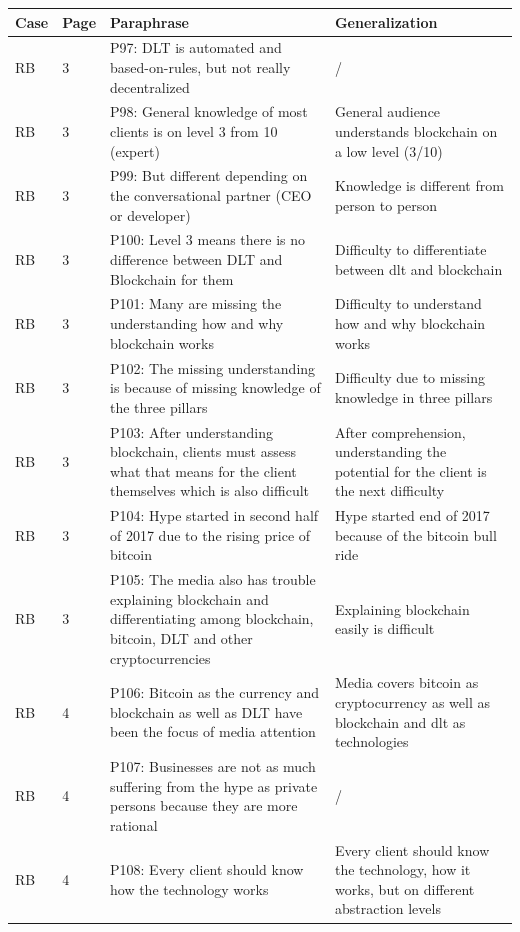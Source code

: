 \begin{table}[H]
    \centering
    \begin{tabularx}{\textwidth}{ll|X|p{4.5cm}}
	Case & Page & Paraphrase & Generalization \\ \hline
	RB & 3 & P97: DLT is automated and based-on-rules, but not really decentralized & /   \\  
	RB & 3 & P98: General knowledge of most clients is on level 3 from 10 (expert) & General audience understands blockchain on a low level (3/10)   \\  
	RB & 3 & P99: But different depending on the conversational partner (CEO or developer) & Knowledge is different from person to person   \\  
	RB & 3 & P100: Level 3 means there is no difference between DLT and Blockchain for them & Difficulty to differentiate between dlt and blockchain   \\  
	RB & 3 & P101: Many are missing the understanding how and why blockchain works & Difficulty to understand how and why blockchain works   \\  
	RB & 3 & P102: The missing understanding is because of missing knowledge of the three pillars & Difficulty due to missing knowledge in three pillars   \\  
	RB & 3 & P103: After understanding blockchain, clients must assess what that means for the client themselves which is also difficult & After comprehension, understanding the potential for the client is the next difficulty   \\  
	RB & 3 & P104: Hype started in second half of 2017 due to the rising price of bitcoin & Hype started end of 2017 because of the bitcoin bull ride   \\  
	RB & 3 & P105: The media also has trouble explaining blockchain and differentiating among blockchain, bitcoin, DLT and other cryptocurrencies & Explaining blockchain easily is difficult   \\  
	RB & 4 & P106: Bitcoin as the currency and blockchain as well as  DLT have been the focus of media attention & Media covers bitcoin as cryptocurrency as well as blockchain and dlt as technologies   \\  
	RB & 4 & P107: Businesses are not as much suffering from the hype as private persons because they are more rational & /   \\  
	RB & 4 & P108: Every client should know how the technology works & Every client should know the technology, how it works, but on different abstraction levels   \\  

\end{tabularx}
\end{table}
